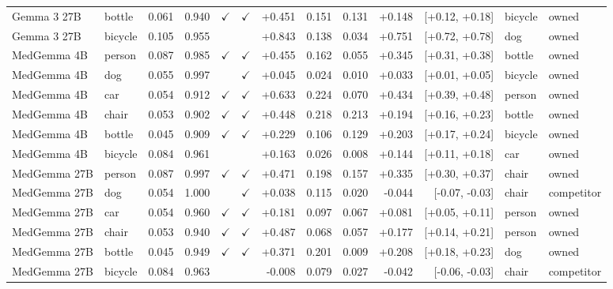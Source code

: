 \begin{longtable}{llrrccrrrrrll}
\rowcolor{cfSlate2}Gemma 3 27B & bottle & 0.061 & 0.940 & $\checkmark$ & $\checkmark$ & +0.451 & 0.151 & 0.131 & +0.148 & [+0.12, +0.18] & bicycle & owned \\
\rowcolor{cfSlate2}Gemma 3 27B & bicycle & 0.105 & 0.955 &  &  & +0.843 & 0.138 & 0.034 & +0.751 & [+0.72, +0.78] & dog & owned \\
\rowcolor{cfSlate2}MedGemma 4B & person & 0.087 & 0.985 & $\checkmark$ & $\checkmark$ & +0.455 & 0.162 & 0.055 & +0.345 & [+0.31, +0.38] & bottle & owned \\
\rowcolor{cfSlate2}MedGemma 4B & dog & 0.055 & 0.997 &  & $\checkmark$ & +0.045 & 0.024 & 0.010 & +0.033 & [+0.01, +0.05] & bicycle & owned \\
\rowcolor{cfSlate2}MedGemma 4B & car & 0.054 & 0.912 & $\checkmark$ & $\checkmark$ & +0.633 & 0.224 & 0.070 & +0.434 & [+0.39, +0.48] & person & owned \\
\rowcolor{cfSlate2}MedGemma 4B & chair & 0.053 & 0.902 & $\checkmark$ & $\checkmark$ & +0.448 & 0.218 & 0.213 & +0.194 & [+0.16, +0.23] & bottle & owned \\
\rowcolor{cfSlate2}MedGemma 4B & bottle & 0.045 & 0.909 & $\checkmark$ & $\checkmark$ & +0.229 & 0.106 & 0.129 & +0.203 & [+0.17, +0.24] & bicycle & owned \\
\rowcolor{cfSlate2}MedGemma 4B & bicycle & 0.084 & 0.961 &  &  & +0.163 & 0.026 & 0.008 & +0.144 & [+0.11, +0.18] & car & owned \\
\rowcolor{cfSlate2}MedGemma 27B & person & 0.087 & 0.997 & $\checkmark$ & $\checkmark$ & +0.471 & 0.198 & 0.157 & +0.335 & [+0.30, +0.37] & chair & owned \\
MedGemma 27B & dog & 0.054 & 1.000 &  & $\checkmark$ & +0.038 & 0.115 & 0.020 & -0.044 & [-0.07, -0.03] & chair & competitor \\
\rowcolor{cfSlate2}MedGemma 27B & car & 0.054 & 0.960 & $\checkmark$ & $\checkmark$ & +0.181 & 0.097 & 0.067 & +0.081 & [+0.05, +0.11] & person & owned \\
\rowcolor{cfSlate2}MedGemma 27B & chair & 0.053 & 0.940 & $\checkmark$ & $\checkmark$ & +0.487 & 0.068 & 0.057 & +0.177 & [+0.14, +0.21] & person & owned \\
\rowcolor{cfSlate2}MedGemma 27B & bottle & 0.045 & 0.949 & $\checkmark$ & $\checkmark$ & +0.371 & 0.201 & 0.009 & +0.208 & [+0.18, +0.23] & dog & owned \\
MedGemma 27B & bicycle & 0.084 & 0.963 &  &  & -0.008 & 0.079 & 0.027 & -0.042 & [-0.06, -0.03] & chair & competitor \\

\end{longtable}
